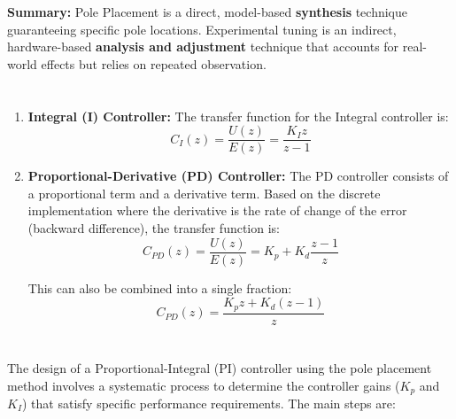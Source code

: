 \documentclass[a4paper,12pt]{article}
\begin{document}
\textbf{Summary:} Pole Placement is a direct, model-based \textbf{synthesis} technique guaranteeing specific pole locations. Experimental tuning is an indirect, hardware-based \textbf{analysis and adjustment} technique that accounts for real-world effects but relies on repeated observation.


\section{}

\begin{enumerate}
    \item \textbf{Integral (I) Controller:}
    The transfer function for the Integral controller is:
    \[ C_I(z) = \frac{U(z)}{E(z)} = \frac{K_I z}{z - 1} \]

    \item \textbf{Proportional-Derivative (PD) Controller:}
    The PD controller consists of a proportional term and a derivative term. Based on the discrete implementation where the derivative is the rate of change of the error (backward difference), the transfer function is:
    \[ C_{PD}(z) = \frac{U(z)}{E(z)} = K_p + K_d \frac{z - 1}{z} \]
    
    This can also be combined into a single fraction:
    \[ C_{PD}(z) = \frac{K_p z + K_d(z - 1)}{z} \]
\end{enumerate}


\section{}

The design of a Proportional-Integral (PI) controller using the pole placement method involves a systematic process to determine the controller gains ($K_p$ and $K_I$) that satisfy specific performance requirements. The main steps are:
\end{document}
